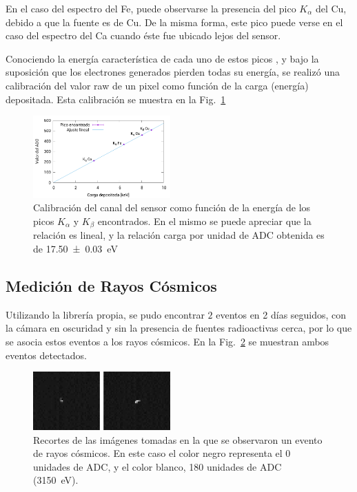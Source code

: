 \documentclass[twoside,twocolumn]{article}
\begin{document}
      En el caso del espectro del Fe, puede observarse la presencia del pico $K_\alpha$ del Cu, debido a que la fuente es de Cu.
      De la misma forma, este pico puede verse en el caso del espectro del Ca cuando éste fue ubicado lejos del sensor.

      Conociendo la energía característica de cada uno de estos picos \cite{xraybooklet},
      y bajo la suposición que los electrones generados pierden todas su energía, %
      se realizó una calibración del valor raw de un pixel como función de la carga (energía) depositada.
      Esta calibración se muestra en la Fig.~\ref{fig:x-ray_calibration}

      \begin{figure}[h]
        \includegraphics[width=0.47\textwidth]{figures/x-ray_calibration}
        \caption{Calibración del canal del sensor como función de la energía de
          los picos $K_{\alpha}$ y $K_{\beta}$ encontrados.
          En el mismo se puede apreciar que la relación es lineal,
          y la relación carga por unidad de ADC obtenida es de \SI{17.50(3)}{\eV}
        }
        \label{fig:x-ray_calibration}
      \end{figure}

    \subsection{Medición de Rayos Cósmicos}\label{sec:results:cosmic_ray}
      Utilizando la librería propia, se pudo encontrar $2$ %
      eventos en 2 días seguidos, con la cámara en oscuridad y sin la presencia de fuentes radioactivas cerca,
      por lo que se asocia estos eventos a los rayos cósmicos.
      En la Fig.~\ref{fig:cosmic_ray} se muestran ambos eventos detectados.

      \begin{figure}[h]
        \centering
        \includegraphics[width=0.47\textwidth]{figures/doble_evento.png} %
        \caption{Recortes de las imágenes tomadas en la que se observaron un evento de rayos cósmicos.
        En este caso el color negro representa el 0 unidades de ADC, y el color blanco, 180 unidades de ADC (\SI{3150}{\eV}).
        }
        \label{fig:cosmic_ray}
      \end{figure}
\end{document}
